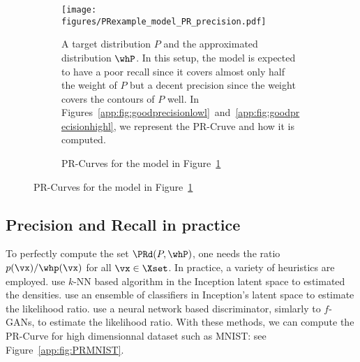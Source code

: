 \documentclass[twoside]{article}
\begin{document}
\begin{figure}[H]
\begin{minipage}[c]{0.3\textwidth}
    \begin{figure}[H]
        \centering
\texttt{[image: figures/PRexample\_model\_PR\_precision.pdf]}
        \caption{A target distribution $P$ and the approximated distribution $\whP$. In this setup, the model is expected to have a poor recall since it covers almost only half the weight of $P$ but a decent precision since the weight covers the contours of $P$ well. In Figures~\ref{app:fig:goodprecisionlowl}~and~\ref{app:fig:goodprecisionhighl}, we represent the PR-Cruve and how it is computed.}
        \label{app:fig:goodprecision}
    \end{figure}
\end{minipage}
\hfill
\begin{minipage}[c]{0.65\textwidth}
    \begin{figure}[H]
        
        \caption{PR-Curves for the model in Figure~\ref{app:fig:goodprecision}}
    \end{figure}
\end{minipage}
\end{figure}

\subsection{Precision and Recall in practice}
To perfectly compute the set $\PRd(P, \whP)$, one needs the ratio $p(\vx)/\whp(\vx)$ for all $\vx\in \Xset$. In practice, a variety of heuristics are employed.
\cite{sajjadi_assessing_2018} use $k$-NN based algorithm in the Inception latent space to estimated the densities. \cite{simon_revisiting_2019} use an ensemble of classifiers in Inception's latent space to estimate the likelihood ratio. \cite{verine_precision-recall_2023}  use a neural network based discriminator, simlarly to $f$-GANs, to estimate the likelihood ratio. With these methods, we can compute the PR-Curve for high dimensionnal dataset such as MNIST: see Figure~\ref{app:fig:PRMNIST}.
\end{document}
